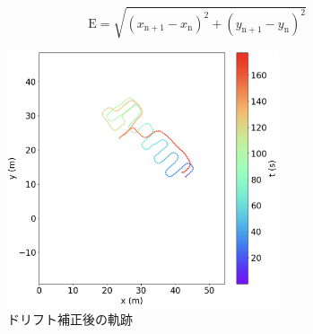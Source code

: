 \vspace{5mm} %
\begin{equation}
	\mathrm{E} = \sqrt{(x_{\mathrm{n+1}} - x_{\mathrm{n}})^2 + (y_{\mathrm{n+1}} - y_{\mathrm{n}})^2}
\end{equation}
\vspace{5mm} %

\begin{figure}[h]
	\centering
	\includegraphics[width=80mm]{image/pdr-remove-drift-two.jpg}
	\caption{ドリフト補正後の軌跡}    \label{fig:pdr-remove-drift}
\end{figure}
